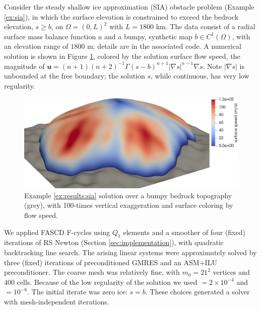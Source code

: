 \documentclass[review,hidelinks,onefignum,onetabnum]{siamart220329}
\newcommand{\grad}{\nabla}
\begin{document}
\begin{example}   \label{ex:results:sia}
Consider the steady shallow ice approximation (SIA) obstacle problem (Example \ref{ex:sia}), in which the surface elevation is constrained to exceed the bedrock elevation, $s\ge b$, on $\Omega=(0,L)^2$ with $L=1800$ km.  The data consist of a radial surface mass balance function $a$ \cite[equation (5.122)]{GreveBlatter2009} and a bumpy, synthetic map $b\in C^1(\Omega)$, with an elevation range of $1800$ m; details are in the associated code.  A numerical solution is shown in Figure \ref{fig:results:siascene}, colored by the solution surface flow speed, the magnitude of $\mathbf{u} = (n+1)(n+2)^{-1} \Gamma (s-b)^{n+1} |\grad s|^{n-1} \grad s$.  Note $|\grad s|$ is unbounded at the free boundary; the solution $s$, while continuous, has very low regularity.

\begin{figure}[ht]
\centering
\includegraphics[width=1.0\textwidth]{fixfigs/sialev8scene.png}
\caption{Example \ref{ex:results:sia} solution over a bumpy bedrock topography (grey), with 100-times vertical exaggeration and surface coloring by flow speed.}
\label{fig:results:siascene}
\end{figure}

We applied FASCD F-cycles using $Q_1$ elements and a smoother of four (fixed) iterations of RS Newton (Section \ref{sec:implementation}), with quadratic backtracking line search.  The arising linear systems were approximately solved by three (fixed) iterations of preconditioned GMRES and an ASM+ILU preconditioner.  The coarse mesh was relatively fine, with $m_0=21^2$ vertices and 400 cells.  Because of the low regularity of the solution we used  $= 2 \times 10^{-4}$ and  $= 10^{-8}$.  The initial iterate was zero ice: $s=b$.  These choices generated a solver with mesh-independent iterations.


\end{example}
\end{document}

